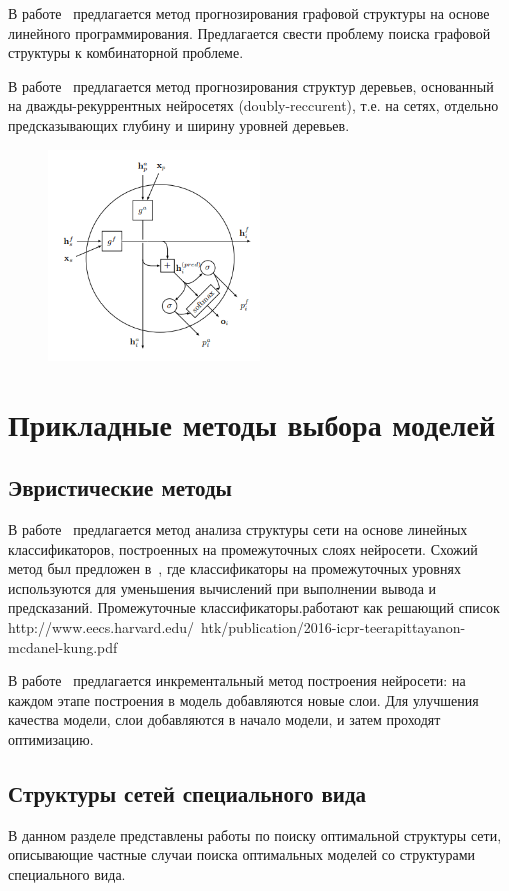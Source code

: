 В работе~\cite{jaakkola2010learning} предлагается метод прогнозирования графовой структуры на основе линейного программирования. Предлагается свести проблему поиска графовой структуры к комбинаторной проблеме.

В работе~\cite{double_rnn} предлагается метод прогнозирования структур деревьев, основанный на дважды-рекуррентных нейросетях (doubly-reccurent), т.е. на сетях, отдельно предсказывающих глубину и ширину уровней деревьев.
\begin{figure}[H]
\includegraphics[width=0.5\textwidth]{./plots/arch_review_figs/jaakkola.png}
\end{figure}


\section{Прикладные методы выбора моделей}
\subsection{Эвристические методы}
В работе~\cite{layer_probe} предлагается метод анализа структуры сети на основе линейных классификаторов, построенных на промежуточных слоях нейросети.
Схожий метод был предложен в~\cite{branches}, где классификаторы на промежуточных уровнях используются для уменьшения вычислений при выполнении вывода и предсказаний.
Промежуточные классификаторы.работают как решающий список
http://www.eecs.harvard.edu/~htk/publication/2016-icpr-teerapittayanon-mcdanel-kung.pdf

В работе~\cite{nn_inc} предлагается инкрементальный метод построения нейросети: на каждом этапе построения в модель добавляются новые слои. Для улучшения качества модели, слои добавляются в начало модели, и затем проходят оптимизацию.

\subsection{Структуры сетей специального вида}
В данном разделе представлены работы по поиску оптимальной структуры сети, описывающие частные случаи поиска оптимальных моделей со структурами специального вида.

